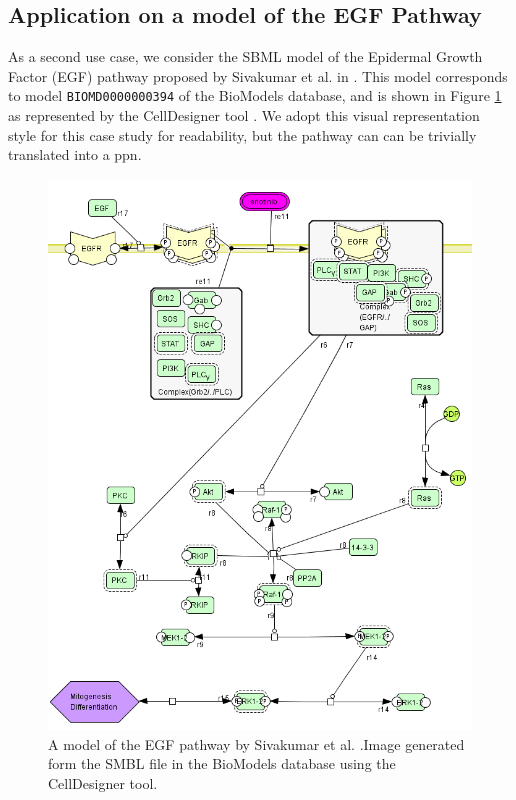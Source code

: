 \subsection{Application on a model of the EGF Pathway}
As a second use case, we consider the SBML model of the Epidermal Growth Factor (EGF) pathway proposed by Sivakumar et al. in \citep{sivakumar2011systems}. This model corresponds to model \texttt{BIOMD0000000394} of the BioModels database, and is shown in Figure \ref{fig:EGF} as represented by the CellDesigner tool \citep{funahashi2003celldesigner}. We adopt this visual representation style for this case study for readability, but the pathway can can be trivially translated into a \gls{ppn}.
\begin{figure}[t]
    \centering
    \includegraphics[width=12cm]{Figures/Chapter5/pathway394}
\caption{A model of the EGF pathway by Sivakumar et al. \citep{sivakumar2011systems}.Image generated form the SMBL file in the BioModels database using the CellDesigner tool.}\label{fig:EGF}
\end{figure}
